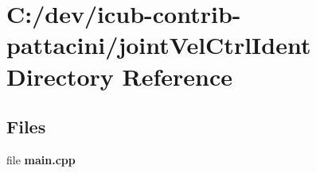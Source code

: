 \section{C\+:/dev/icub-\/contrib-\/pattacini/joint\+Vel\+Ctrl\+Ident Directory Reference}
\label{dir_af7a84423bef2ae2ddeb62d3c973383c}
\subsection*{Files}
\begin{DoxyCompactItemize}
\item 
file {\bfseries main.\+cpp}
\end{DoxyCompactItemize}
